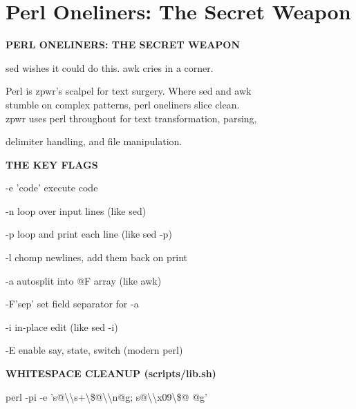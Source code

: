 \documentclass[11pt,a4paper,twoside]{book}
\begin{document}
\section{Perl Oneliners: The Secret Weapon}


\vspace{10pt}
{\large\bfseries\color{neoncyan} PERL ONELINERS: THE SECRET WEAPON}\vspace{6pt}

sed wishes it could do this. awk cries in a corner.

\begin{codebox}
Perl is zpwr's scalpel for text surgery. Where sed and awk\\
stumble on complex patterns, perl oneliners slice clean.\\
zpwr uses perl throughout for text transformation, parsing,\\
\end{codebox}

delimiter handling, and file manipulation.


\vspace{12pt}
{\bfseries\color{neonyellow} THE KEY FLAGS}\vspace{4pt}

-e 'code'     execute code

-n            loop over input lines (like sed)

-p            loop and print each line (like sed -p)

-l            chomp newlines, add them back on print

-a            autosplit into @F array (like awk)

-F'sep'       set field separator for -a

-i            in-place edit (like sed -i)

\begin{codebox}
-E            enable say, state, switch (modern perl)\\
\end{codebox}


\vspace{12pt}
{\bfseries\color{neonyellow} WHITESPACE CLEANUP (scripts/lib.sh)}\vspace{4pt}

\begin{codebox}
perl -pi -e 's@\textbackslash{}\textbackslash{}s+\textbackslash{}\$@\textbackslash{}\textbackslash{}n@g; s@\textbackslash{}\textbackslash{}x09\textbackslash{}\$@    @g'\\
\end{codebox}
\end{document}
